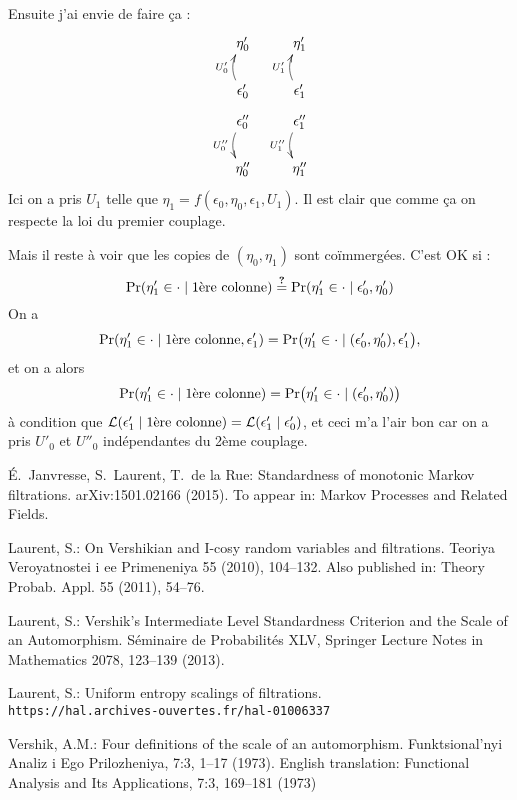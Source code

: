 \documentclass[12pt,a4paper]{article}
\begin{document}
\begin{appendices}
Ensuite j'ai envie de faire ça :
\begin{displaymath}
\xymatrix @R=.5pc{
\eta'_0  & \eta'_1 \\ \\
\epsilon'_0  \ar@/^.6pc/[uu]^{U'_0} & \epsilon'_1  \ar@/^.6pc/[uu]^{U'_1}  \\
\epsilon''_0  \ar@/^-.6pc/[dd]_{U''_0} & \epsilon''_1  \ar@/^-.6pc/[dd]_{U''_1}  \\ \\
\eta''_0 & \eta''_1
}
\end{displaymath}
Ici on a pris $U_1$ telle que $\eta_1 = f(\epsilon_0, \eta_0, \epsilon_1,U_1)$. 
Il est clair que comme ça on respecte la loi du premier couplage. 

Mais il reste à voir que les copies de $(\eta_0, \eta_1)$ sont co\"immergées. 
C'est OK si :
$$
\Pr(\eta'_1 \in \cdot \mid \text{1ère colonne}) \overset{\boldsymbol ?}{=} \Pr(\eta'_1 \in \cdot \mid \epsilon'_0, \eta'_0)
$$
On a 
$$ 
\Pr(\eta'_1 \in \cdot \mid \text{1ère colonne}, \epsilon'_1) =  
\Pr\bigl(\eta'_1 \in \cdot \mid (\epsilon'_0, \eta'_0), \epsilon'_1\bigr),
$$
et on a alors 
$$ 
\Pr(\eta'_1 \in \cdot \mid \text{1ère colonne}) =  
\Pr\bigl(\eta'_1 \in \cdot \mid (\epsilon'_0, \eta'_0)\bigr)
$$
à condition que 
${\cal L}(\epsilon'_1 \mid \text{1ère colonne}) = 
 {\cal L}(\epsilon'_1 \mid \epsilon'_0)$, et ceci m'a l'air bon 
 car on a pris $U'_0$ et $U''_0$ indépendantes du 2ème couplage. 

\end{appendices}

\newpage

\begin{thebibliography}{99.}

\'E.~Janvresse, S.~Laurent, T.~de la Rue: 
Standardness of monotonic Markov filtrations. 
	arXiv:1501.02166 (2015). 
To appear in: Markov Processes and Related Fields. 


 Laurent, S.: 
On Vershikian and I-cosy random variables and filtrations.
Teoriya Veroyatnostei i ee Primeneniya 55 (2010), 104--132. 
Also published in: Theory Probab. Appl. 55 (2011), 54--76.


Laurent, S.: 
Vershik's Intermediate Level Standardness Criterion and the Scale of an Automorphism. 
S\'eminaire de Probabilit\'es XLV,
Springer Lecture Notes in Mathematics 2078,
123--139 (2013).

Laurent, S.: 
Uniform entropy scalings of filtrations. \\
\verb+https://hal.archives-ouvertes.fr/hal-01006337+ 


Vershik, A.M.: 
Four definitions of the scale of an automorphism. 
Funktsional'nyi Analiz i Ego Prilozheniya, 7:3, 
1--17 (1973). 
English translation:    
Functional Analysis and Its Applications, 7:3, 169--181 (1973)



\end{thebibliography}
\end{document}
